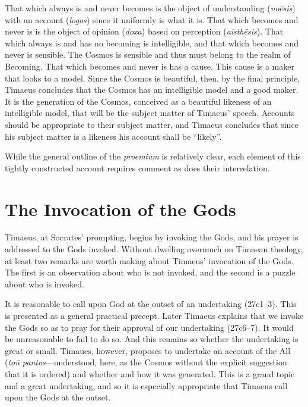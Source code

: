 That which always is and never becomes is the object of understanding (\emph{noēsis}) with an account (\emph{logos}) since it uniformly is what it is. That which becomes and never is is the object of opinion (\emph{doxa}) based on perception (\emph{aisthēsis}). That which always is and has no becoming is intelligible, and that which becomes and never is sensible. The Cosmos is sensible and thus must belong to the realm of Becoming. That which becomes and never is has a cause. This cause is a maker that looks to a model. Since the Cosmos is beautiful, then, by the final principle, Timaeus concludes that the Cosmos has an intelligible model and a good maker. It is the generation of the Cosmos, conceived as a beautiful likeness of an intelligible model, that will be the subject matter of Timaeus' speech. Accounts should be appropriate to their subject matter, and Timaeus concludes that since his subject matter is a likeness his account shall be ``likely''.

While the general outline of the \emph{proemium} is relatively clear, each element of this tightly constructed account requires comment as does their interrelation. 


\section{The Invocation of the Gods} %
\label{sec:the_invocation_of_the_gods}

Timaeus, at Socrates' prompting, begins by invoking the Gods, and his prayer is addressed to the Gods invoked. Without dwelling overmuch on Timaean theology, at least two remarks are worth making about Timae\-us' invocation of the Gods. The first is an observation about who is not invoked, and the second is a puzzle about who is invoked.

It is reasonable to call upon God at the outset of an undertaking (27c1--3). This is presented as a general practical precept. Later Timaeus explains that we invoke the Gods so as to pray for their approval of our undertaking (27c6--7). It would be unreasonable to fail to do so. And this remains so whether the undertaking is great or small. Timaues, however, proposes to undertake an account of the All (\emph{toū pantos}---understood, here, as the Cosmos without the explicit suggestion that it is ordered) and whether and how it was generated. This is a grand topic and a great undertaking, and so it is especially appropriate that Timaeus call upon the Gods at the outset.

